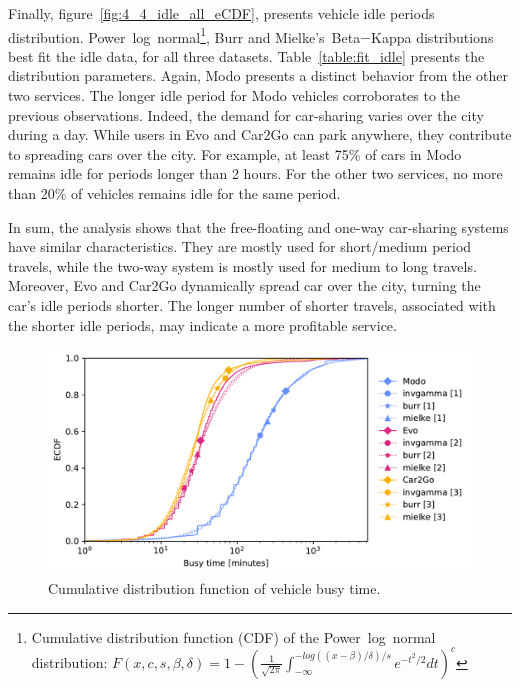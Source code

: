 Finally, figure~\ref{fig:4_4_idle_all_eCDF}, presents vehicle idle periods distribution.  Power~log~normal\footnote{Cumulative distribution function (CDF) of the Power~log~normal distribution: $F(x,c,s,\beta,\delta)=1-\left(\frac{1}{\sqrt{2\pi}}\int_{-\infty}^{-log((x-\beta)/\delta)/s}e^{-t^{2}/2}dt\right)^{c}$}, Burr and Mielke's~Beta$-$Kappa distributions best fit the idle data, for all three datasets. Table~\ref{table:fit_idle} presents the distribution parameters. 
Again, Modo presents a distinct behavior from the other two services. The longer idle period for Modo vehicles corroborates to the previous observations. Indeed, the demand for car-sharing varies over the city during a day. While users in Evo and Car2Go can park anywhere, they contribute to spreading cars over the city. For example, at least 75\% of cars in Modo remains idle for periods longer than 2 hours. For the other two services, no more than 20\% of vehicles remains idle for the same period.

In sum, the analysis shows that the free-floating and one-way car-sharing systems have similar characteristics. They are mostly used for short/medium period travels, while the two-way system is mostly used for medium to long travels. 
Moreover, Evo and Car2Go dynamically spread car over the city, turning the car's idle periods shorter. The longer number of shorter travels, associated with the shorter idle periods, may indicate a more profitable service.

\begin{figure}[tbh]
   \centering
   \includegraphics[width=0.85\columnwidth]{images_test/CDF_Fit_final.pdf}
   \caption{Cumulative distribution function of vehicle busy time.}
   \label{fig:4_4_busy_all_eCDF}
\end{figure}


